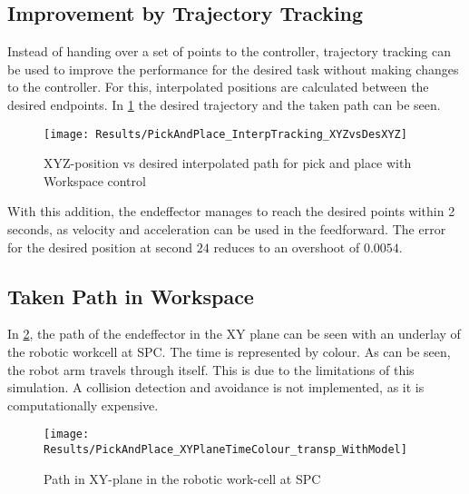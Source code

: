 \subsection{Improvement by Trajectory Tracking}
Instead of handing over a set of points to the controller, trajectory tracking can be used to improve the performance for the desired task without making changes to the controller.
For this, interpolated positions are calculated between the desired endpoints.
In \cref{fig:PickAndPlace_InterpTracking_XYZvsDesXYZ} the desired trajectory and the taken path can be seen.
\begin{figure}[H]
	\texttt{[image: Results/PickAndPlace\_InterpTracking\_XYZvsDesXYZ]}
	\caption{XYZ-position vs desired interpolated path for pick and place with Workspace control}
	\label{fig:PickAndPlace_InterpTracking_XYZvsDesXYZ}
\end{figure}
With this addition, the endeffector manages to reach the desired points within 2 seconds, as velocity and acceleration can be used in the feedforward. The error for the desired position at second $24$ reduces to an overshoot of $0.0054$.

\subsection{Taken Path in Workspace}
In \cref{fig:PickAndPlace_XYPlane_WithModel}, the path of the endeffector in the XY plane can be seen with an underlay of the robotic workcell at SPC. The time is represented by colour.
As can be seen, the robot arm travels through itself. This is due to the limitations of this simulation. A collision detection and avoidance is not implemented, as it is computationally expensive. 

\begin{figure}[H]
	\texttt{[image: Results/PickAndPlace\_XYPlaneTimeColour\_transp\_WithModel]}
	\caption{Path in XY-plane in the robotic work-cell at SPC}
	\label{fig:PickAndPlace_XYPlane_WithModel}
\end{figure}